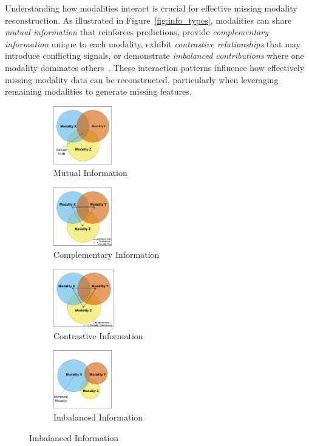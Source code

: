 Understanding how modalities interact
is crucial for effective missing modality reconstruction.
As illustrated in Figure~\ref{fig:info_types},
modalities can share \emph{mutual information}
that reinforces predictions,
provide \emph{complementary information}
unique to each modality,
exhibit \emph{contrastive relationships}
that may introduce conflicting signals,
or demonstrate \emph{imbalanced contributions}
where one modality dominates others~\cite{%
	wang2020makes,Peng2022Balanced,%
	hazarika2022analyzing,geraghty2023understanding,redcore}.
These interaction patterns influence how effectively
missing modality data can be reconstructed,
particularly when leveraging remaining modalities
to generate missing features.
\begin{figure}[b!]
    \centering
    \begin{subfigure}[b]{0.24\textwidth}
        \centering
        \includegraphics[height=1in]{imgs/mutual_info.png}
        \caption{Mutual Information}
        \label{fig:mutual}
    \end{subfigure}
    \hfill
    \begin{subfigure}[b]{0.24\textwidth}
        \centering
        \includegraphics[height=1in]{imgs/complementary_info.png}
        \caption{Complementary Information}
        \label{fig:complementary}
    \end{subfigure}
    \hfill
    \begin{subfigure}[b]{0.24\textwidth}
        \centering
        \includegraphics[height=1in]{imgs/contrastive_info.png}
        \caption{Contrastive Information}
        \label{fig:contrastive}
    \end{subfigure}
    \hfill
    \begin{subfigure}[b]{0.24\textwidth}
        \centering
        \includegraphics[height=1in]{imgs/imbalanced_info.png}
        \caption{Imbalanced Information}
        \label{fig:imbalanced}
    \end{subfigure}
    

\end{figure}
